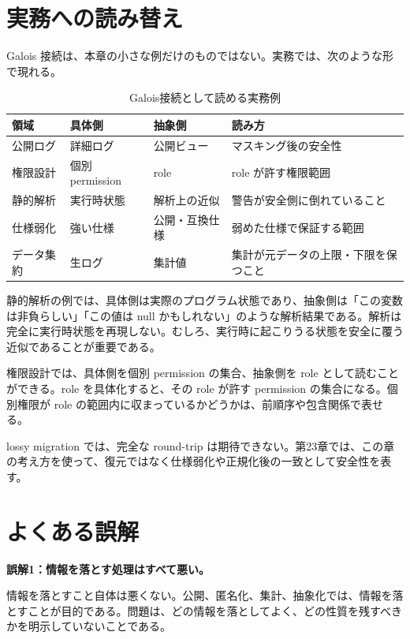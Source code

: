 \section{実務への読み替え}

Galois 接続は、本章の小さな例だけのものではない。実務では、次のような形で現れる。

\begin{table}[htbp]
\centering
\caption{Galois接続として読める実務例}
\label{tab:ch16-galois-applications}
\begin{tabular}{llll}
\toprule
領域 & 具体側 & 抽象側 & 読み方 \\
\midrule
公開ログ & 詳細ログ & 公開ビュー & マスキング後の安全性 \\
権限設計 & 個別 permission & role & role が許す権限範囲 \\
静的解析 & 実行時状態 & 解析上の近似 & 警告が安全側に倒れていること \\
仕様弱化 & 強い仕様 & 公開・互換仕様 & 弱めた仕様で保証する範囲 \\
データ集約 & 生ログ & 集計値 & 集計が元データの上限・下限を保つこと \\
\bottomrule
\end{tabular}
\end{table}

静的解析の例では、具体側は実際のプログラム状態であり、抽象側は「この変数は非負らしい」「この値は null かもしれない」のような解析結果である。解析は完全に実行時状態を再現しない。むしろ、実行時に起こりうる状態を安全に覆う近似であることが重要である。

権限設計では、具体側を個別 permission の集合、抽象側を role として読むことができる。role を具体化すると、その role が許す permission の集合になる。個別権限が role の範囲内に収まっているかどうかは、前順序や包含関係で表せる。

lossy migration では、完全な round-trip は期待できない。第23章では、この章の考え方を使って、復元ではなく仕様弱化や正規化後の一致として安全性を表す。

\section{よくある誤解}

\begin{warningbox}
\textbf{誤解1：情報を落とす処理はすべて悪い。}\par
情報を落とすこと自体は悪くない。公開、匿名化、集計、抽象化では、情報を落とすことが目的である。問題は、どの情報を落としてよく、どの性質を残すべきかを明示していないことである。
\end{warningbox}

